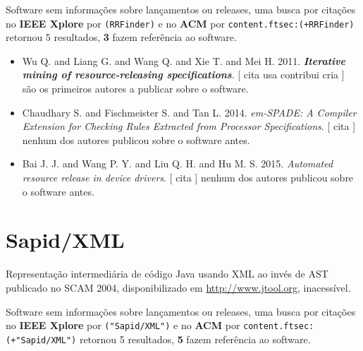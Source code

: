 Software sem informações sobre lançamentos ou releases,
uma busca por citações no {\bf IEEE Xplore} por
\texttt{(RRFinder)}
e no {\bf ACM} por
\texttt{content.ftsec:(+RRFinder)}
retornou
5 resultados,
{\bf 3} fazem referência ao software.

\begin{itemize}
\item Wu Q. and Liang G. and Wang Q. and Xie T. and Mei H.
      2011.
        \textbf{\textit{ Iterative mining of resource-releasing specifications}}.
      [
          cita
          usa
          contribui
          cria
      ]
são os primeiros autores a publicar sobre o software.
\item Chaudhary S. and Fischmeister S. and Tan L.
      2014.
        \textit{ em-SPADE: A Compiler Extension for Checking Rules Extracted from Processor Specifications}.
      [
          cita
      ]
nenhum dos autores publicou sobre o software antes.
\item Bai J. J. and Wang P. Y. and Liu Q. H. and Hu M. S.
      2015.
        \textit{ Automated resource release in device drivers}.
      [
          cita
      ]
nenhum dos autores publicou sobre o software antes.
\end{itemize}
\section{Sapid/XML}

Representação intermediária de código Java usando XML ao invés de AST
publicado no SCAM 2004,
disponibilizado em \url{http://www.jtool.org},
inacessível.

Software sem informações sobre lançamentos ou releases,
uma busca por citações no {\bf IEEE Xplore} por
\texttt{("Sapid/XML")}
e no {\bf ACM} por
\texttt{content.ftsec:(+"Sapid/XML")}
retornou
5 resultados,
{\bf 5} fazem referência ao software.

